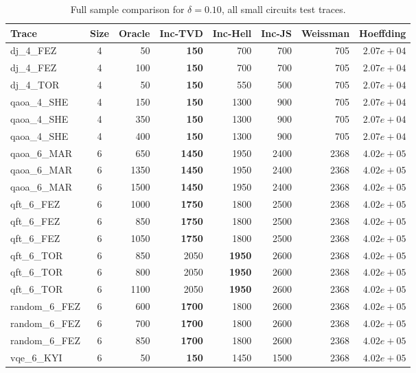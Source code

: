 \begin{table}[ht!]
\centering
\footnotesize
\setlength{\tabcolsep}{3pt}
\renewcommand{\arraystretch}{1.05}
\caption{Full sample comparison for $\delta = 0.10$, all small circuits test traces.}
\label{tab:appendix-sota-d01-s}
\begin{tabular}{l c r r r r r r}
\toprule
Trace & Size & Oracle & Inc-TVD & Inc-Hell & Inc-JS & Weissman & Hoeffding \\
\midrule
dj\_4\_FEZ & 4 & 50 & \textbf{150} & 700 & 700 & 705 & $2.07e+04$ \\
dj\_4\_FEZ & 4 & 100 & \textbf{150} & 700 & 700 & 705 & $2.07e+04$ \\
dj\_4\_TOR & 4 & 50 & \textbf{150} & 550 & 500 & 705 & $2.07e+04$ \\
qaoa\_4\_SHE & 4 & 150 & \textbf{150} & 1300 & 900 & 705 & $2.07e+04$ \\
qaoa\_4\_SHE & 4 & 350 & \textbf{150} & 1300 & 900 & 705 & $2.07e+04$ \\
qaoa\_4\_SHE & 4 & 400 & \textbf{150} & 1300 & 900 & 705 & $2.07e+04$ \\
qaoa\_6\_MAR & 6 & 650 & \textbf{1450} & 1950 & 2400 & 2368 & $4.02e+05$ \\
qaoa\_6\_MAR & 6 & 1350 & \textbf{1450} & 1950 & 2400 & 2368 & $4.02e+05$ \\
qaoa\_6\_MAR & 6 & 1500 & \textbf{1450} & 1950 & 2400 & 2368 & $4.02e+05$ \\
qft\_6\_FEZ & 6 & 1000 & \textbf{1750} & 1800 & 2500 & 2368 & $4.02e+05$ \\
qft\_6\_FEZ & 6 & 850 & \textbf{1750} & 1800 & 2500 & 2368 & $4.02e+05$ \\
qft\_6\_FEZ & 6 & 1050 & \textbf{1750} & 1800 & 2500 & 2368 & $4.02e+05$ \\
qft\_6\_TOR & 6 & 850 & 2050 & \textbf{1950} & 2600 & 2368 & $4.02e+05$ \\
qft\_6\_TOR & 6 & 800 & 2050 & \textbf{1950} & 2600 & 2368 & $4.02e+05$ \\
qft\_6\_TOR & 6 & 1100 & 2050 & \textbf{1950} & 2600 & 2368 & $4.02e+05$ \\
random\_6\_FEZ & 6 & 600 & \textbf{1700} & 1800 & 2600 & 2368 & $4.02e+05$ \\
random\_6\_FEZ & 6 & 700 & \textbf{1700} & 1800 & 2600 & 2368 & $4.02e+05$ \\
random\_6\_FEZ & 6 & 850 & \textbf{1700} & 1800 & 2600 & 2368 & $4.02e+05$ \\
vqe\_6\_KYI & 6 & 50 & \textbf{150} & 1450 & 1500 & 2368 & $4.02e+05$ \\

\end{tabular}
\end{table}
